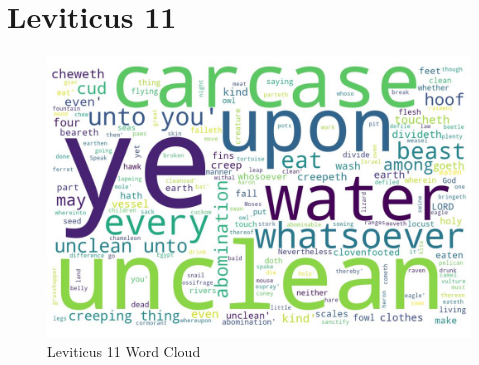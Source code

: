\chapter{Leviticus 11}

\begin{figure}
  \includegraphics[width=\linewidth]{03OT-Leviticus/Leviticus11-WordCloud.jpg}
  \caption{Leviticus 11 Word Cloud}
  \label{fig:Leviticus 11 word Cloud}
\end{figure}

